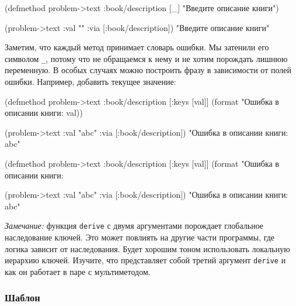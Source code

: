 \else

  \begin{clojure}
(defmethod problem->text :book/description [_]
  "Введите описание книги")

(problem->text {:val "" :via [:book/description]})
"Введите описание книги"
  \end{clojure}

\fi


Заметим, что каждый метод принимает словарь ошибки. Мы затенили его символом
\verb|_|, потому что не обращаемся к нему и не хотим порождать лишнюю
переменную. В особых случаях можно построить фразу в зависимости от полей
ошибки. Например, добавить текущее значение:

\ifx\DEVICETYPE\MOBILE

  \begin{clojure}
(defmethod problem->text
  :book/description
  [{:keys [val]}]
  (format "Ошибка в описании книги: %
    val))

(problem->text
  {:val "abc" :via [:book/description]})
"Ошибка в описании книги: abc"
  \end{clojure}

\else

  \begin{clojure}
(defmethod problem->text :book/description
  [{:keys [val]}]
  (format "Ошибка в описании книги: %

(problem->text {:val "abc" :via [:book/description]})
"Ошибка в описании книги: abc"
  \end{clojure}

\fi

\emph{Замечание:} функция \verb|derive| с двумя аргументами порождает глобальное
наследование ключей. Это может повлиять на другие части программы, где логика
зависит от наследования. Будет хорошим тоном использовать локальную иерархию
ключей. Изучите, что представляет собой третий аргумент \verb|derive| и как он
работает в паре с мультиметодом.

\subsubsection{Шаблон}


